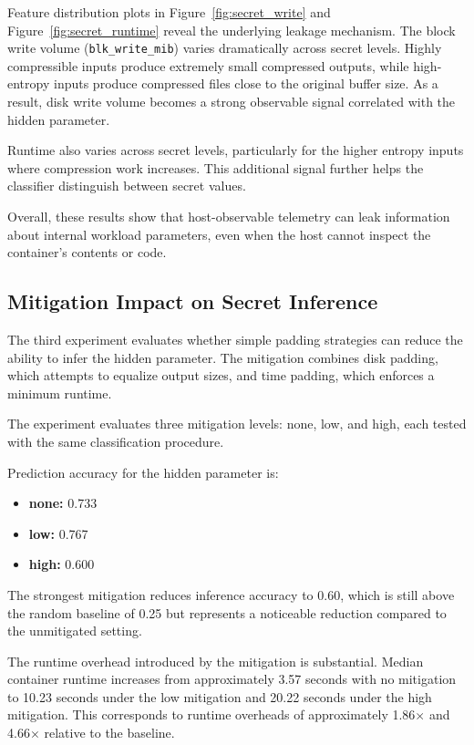 \documentclass[11pt]{article}
\begin{document}
Feature distribution plots in Figure~\ref{fig:secret_write} and Figure~\ref{fig:secret_runtime} reveal the underlying leakage mechanism. The block write volume (\texttt{blk\_write\_mib}) varies dramatically across secret levels. Highly compressible inputs produce extremely small compressed outputs, while high-entropy inputs produce compressed files close to the original buffer size. As a result, disk write volume becomes a strong observable signal correlated with the hidden parameter.

Runtime also varies across secret levels, particularly for the higher entropy inputs where compression work increases. This additional signal further helps the classifier distinguish between secret values.

Overall, these results show that host-observable telemetry can leak information about internal workload parameters, even when the host cannot inspect the container's contents or code.

\subsection{Mitigation Impact on Secret Inference}

The third experiment evaluates whether simple padding strategies can reduce the ability to infer the hidden parameter. The mitigation combines disk padding, which attempts to equalize output sizes, and time padding, which enforces a minimum runtime.

The experiment evaluates three mitigation levels: none, low, and high, each tested with the same classification procedure.

Prediction accuracy for the hidden parameter is:

\begin{itemize}
    \item \textbf{none:} 0.733
    \item \textbf{low:} 0.767
    \item \textbf{high:} 0.600
\end{itemize}

The strongest mitigation reduces inference accuracy to 0.60, which is still above the random baseline of 0.25 but represents a noticeable reduction compared to the unmitigated setting.

The runtime overhead introduced by the mitigation is substantial. Median container runtime increases from approximately 3.57 seconds with no mitigation to 10.23 seconds under the low mitigation and 20.22 seconds under the high mitigation. This corresponds to runtime overheads of approximately 1.86$\times$ and 4.66$\times$ relative to the baseline.
\end{document}
